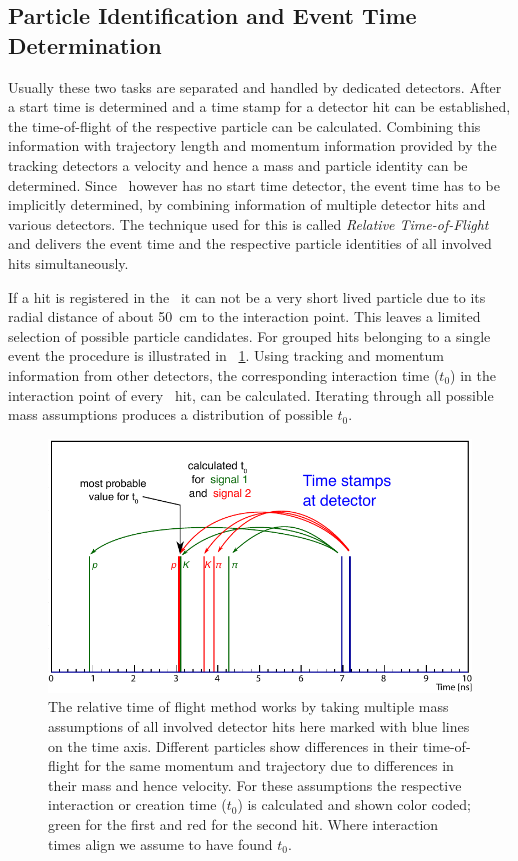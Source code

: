 \documentclass[../BTOF_summary.tex]{subfiles}
\begin{document}

\subsection{Particle Identification and Event Time Determination}

Usually these two tasks are separated and handled by dedicated detectors.
After a start time is determined and a time stamp for a detector hit can be established, the time-of-flight of the respective particle can be calculated.
Combining this information with trajectory length and momentum information provided by the tracking detectors a velocity and hence a mass and particle identity can be determined.
Since \panda\ however has no start time detector, the event time has to be implicitly determined, by combining information of multiple detector hits and various detectors.
The technique used for this is called \emph{Relative Time-of-Flight} and delivers the event time and the respective particle identities of all involved hits simultaneously.

If a hit is registered in the \btofD\ it can not be a very short lived particle due to its radial distance of about \SI{50}{cm} to the interaction point.
This leaves a limited selection of possible particle candidates.
For grouped hits belonging to a single event the procedure is illustrated in \fig ~\ref{fig:relToF}.
Using tracking and momentum information from other detectors, the corresponding interaction time ($t_0$) in the interaction point of every \btof\ hit, can be calculated.
Iterating through all possible mass assumptions produces a distribution of possible $t_0$.
 
\begin{figure}
	\centering
	\includegraphics[width=.9\textwidth]{fig/relTof_basic.pdf}
	\caption{The relative time of flight method works by taking multiple mass assumptions of all involved detector hits here marked with blue lines on the time axis. Different particles show differences in their time-of-flight for the same momentum and trajectory due to differences in their mass and hence velocity. For these assumptions the respective interaction or creation time ($t_0$) is calculated and shown color coded; green for the first and red for the second hit. Where interaction times align we assume to have found $t_0$.}
	\label{fig:relToF}
\end{figure}
\end{document}

